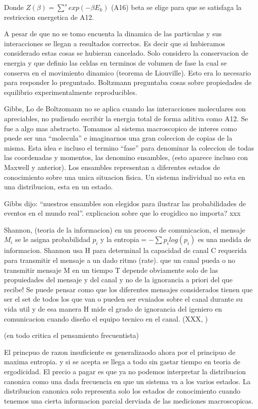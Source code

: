 \documentclass[20pt]{extarticle}
\begin{document}
Donde $Z(\beta) = \sum^s exp(-\beta E_k)$ (A16)
beta se elige para que se satisfaga la restriccion energetica de  A12.


A pesar de que no se tomo encuenta la dinamica de las particulas y sus interacciones se llegan a resultados correctos. Es decir que si hubieramos considerado estas cosas se hubieran cancelado. Solo considero la conservacion de energia y que definio las celdas en terminos de volumen de fase la cual se conserva en el movimiento dinamico (teorema de Liouville).
Esto era lo necesario para responder lo preguntado. Boltzmann preguntaba cosas sobre propiedades de equilibrio experimentalmente reproducibles.

Gibbs,
Lo de Boltzomann no se aplica cuando las interacciones moleculares son apreciables, no pudiendo escribir la energia total de forma aditiva como A12.
Se fue a algo mas abstracto.
Tomamos al sistema macroscopico de interes como puede ser una “molecula” e imaginarnos una gran coleccion de copias de la misma.
Esta idea e incluso el termino “fase” para denominar la coleccion de todas las coordenadas y momentos, las denomino ensambles, (esto aparece incluso con Maxwell y anterior).
Los ensambles representan a diferentes estados de conocimiento sobre una unica situacion fisica.
Un sistema individual no esta en una distribucion, esta en un estado.

Gibbs dijo: “nuestros ensambles son elegidos para ilustrar las probabilidades de eventos en el mundo real”.
explicacion sobre que lo erogidico no importa? xxx

Shannon, (teoria de la informacion)
en un proceso de comunicacion, el mensaje $M_i$ se le asigna probabilidad $p_i$ y la entropia$ = -\sum p_i log(p_i)$ es una medida de informacion.
Shannon usa H para determinal la capacidad de canal C requerida para transmitir el mensaje a un dado ritmo (rate).
que un canal pueda o no transmitir mensaje M en un tiempo T depende obviamente solo de las propuiedades del mensaje y del canal y no de la ignorancia a priori del que recibe!
Se puede pensar como que los diferentes mensajes considerados tienen que ser el set de todos los que van o pueden ser evniados sobre el canal durante su vida util y de esa manera H mide el grado de ignorancia del igeniero en comunicacion cuando diseño el equipo tecnico en el canal. (XXX, )

(en todo critica el pensamiento frecuentista)

El princpuo de razon insuficiente es generalizaodo ahora por el principuo de maxima entropia. y si se acepta se llega a todo sin gastar tiempo en teoria de ergodicidad.
El precio a pagar es que ya no podemos interpretar la distribucion canonica como una dada frecuencia en que un sistema va a los varios estados.
La distribucion canonica solo representa solo los estados de conocimiento cuando tenemos una cierta informacion parcial  derviada de las mediciones macroscopicas.
\end{document}

